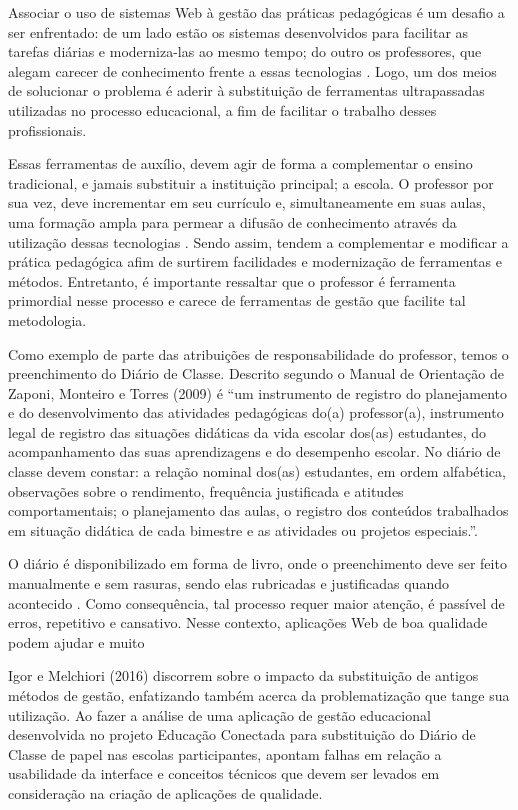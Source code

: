 Associar o uso de sistemas Web à gestão das práticas pedagógicas é um desafio a ser enfrentado: de um lado estão os sistemas desenvolvidos para facilitar as tarefas diárias e moderniza-las ao mesmo tempo; do outro os professores, que alegam carecer de conhecimento frente a essas tecnologias \cite{REP's1158}. Logo, um dos meios de solucionar o problema é aderir à substituição de ferramentas ultrapassadas utilizadas no processo educacional, a fim de facilitar o trabalho desses profissionais.


Essas ferramentas de auxílio, devem agir de forma a complementar o ensino tradicional, e jamais substituir a instituição principal; a escola. O professor por sua vez, deve incrementar em seu currículo e, simultaneamente em suas aulas, uma formação ampla para permear a difusão de conhecimento através da utilização dessas tecnologias  \cite{albino2016avaliaccao}. Sendo assim, tendem a complementar e modificar a prática pedagógica afim de surtirem  facilidades e modernização de ferramentas e métodos. Entretanto, é importante ressaltar que o professor é ferramenta primordial nesse processo e carece de ferramentas de gestão que facilite tal metodologia.


Como exemplo de parte das atribuições de responsabilidade do professor, temos o preenchimento do Diário de Classe. Descrito segundo o Manual de Orientação de Zaponi, Monteiro e Torres (2009) é “um instrumento de registro do planejamento e do desenvolvimento das atividades pedagógicas do(a) professor(a), instrumento legal de registro das situações didáticas da vida escolar dos(as) estudantes, do acompanhamento das suas aprendizagens e do desempenho escolar. No diário de classe devem constar: a relação nominal dos(as) estudantes, em ordem alfabética, observações sobre o rendimento, frequência justificada e atitudes comportamentais; o planejamento das aulas, o registro dos conteúdos trabalhados em situação didática de cada bimestre e as atividades ou projetos especiais.”.

O diário é disponibilizado em forma de livro, onde o preenchimento deve ser feito manualmente e sem rasuras, sendo elas rubricadas e justificadas quando acontecido \cite{teresa1999manual}. Como consequência, tal processo requer maior atenção, é passível de erros, repetitivo e cansativo. Nesse contexto, aplicações Web de boa qualidade podem ajudar e muito  

Igor e Melchiori (2016) discorrem sobre o impacto da substituição de antigos métodos de gestão, enfatizando também acerca da problematização que tange sua utilização. Ao fazer a análise de uma aplicação de gestão educacional desenvolvida no projeto Educação Conectada para substituição do Diário de Classe de papel nas escolas participantes, apontam falhas em relação a usabilidade da interface e conceitos técnicos que devem ser levados em consideração na criação de aplicações de qualidade.

